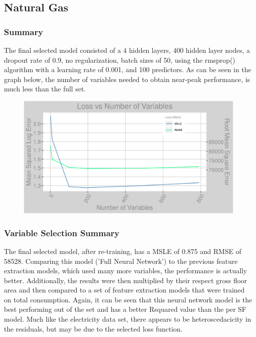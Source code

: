 \subsection{Natural Gas}
\subsubsection{Summary}
The final selected model consisted of a 4 hidden layers, 400 hidden layer nodes, a dropout rate of 0.9, no regularization, batch sizes of 50, using the rmsprop() algorithm with a learning rate of 0.001, and 100 predictors.  As can be seen in the graph below, the number of variables needed to obtain near-peak performance, is much less than the full set.

\begin{figure}[h]
\centering
\includegraphics[width=\textwidth, height=0.25\textheight]{Images/natural_gas_psf_nn_error.png}
\end{figure}

\subsubsection{Variable Selection Summary}
The final selected model, after re-training, has a MSLE of 0.875 and RMSE of 58528.  Comparing this model ('Full Neural Network') to the previous feature extraction models, which used many more variables, the performance is actually better.  Additionally, the results were then multiplied by their respect gross floor area and then compared to a set of feature extraction models that were trained on total consumption.  Again, it can be seen that this neural network model is the best performing out of the set and has a better Rsquared value than the per SF model.  Much like the electricity data set, there appears to be heteroscedacicity in the residuals, but may be due to the selected loss function.

